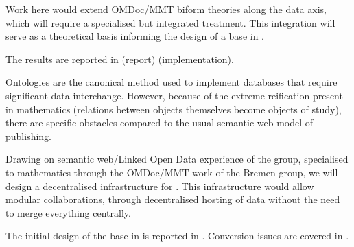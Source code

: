 \begin{workpackage}[id=dksbases,%
  title=Data/Knowledge/Software-Bases,lead=JU,
  ZHRM=12,JURM=46,UWRM=25,SARM=10,LLRM=2,PSRM=4]
\begin{tasklist}
\begin{task}[title=Triform Theories in OMDoc/MMT,id=data-triform,
  lead=JU,partners={ZH},PM=12,wphases=0-12]
  Work here would extend OMDoc/MMT biform theories along the data axis, which will require
  a specialised but integrated treatment. This integration will serve as a theoretical
  basis informing the design of a \DKS base in .

  The results are reported in  (report) 
  (implementation).
\end{task}

\begin{task}[id=data-design,lead=JU,partners={ZH,US,SA,UW,LL},wphases={6-12,15-18!.33},PM=12,
  title={\DKS Base Design}]
  Ontologies are the canonical method used to implement databases that require significant
  data interchange. However, because of the extreme reification present in mathematics
  (relations between objects themselves become objects of study), there are specific
  obstacles compared to the usual semantic web model of publishing.

  Drawing on semantic web/Linked Open Data experience of the  group, specialised
  to mathematics through the OMDoc/MMT work of the Bremen group, we will design a
  decentralised infrastructure for \TheProject. This infrastructure would allow modular
  collaborations, through decentralised hosting of data without the need to merge
  everything centrally.
  
  The initial design of the \DKS base in \TheProject is reported in
 . Conversion issues are covered in .
\end{task}

\begin{task}[title=Computational Foundation for Python/Sage,
  id=data-foundationCAS,lead=JU,partners={ZH,SA},PM=9,wphases=6-18!.66]


\end{task}
\end{tasklist}
\end{workpackage}
